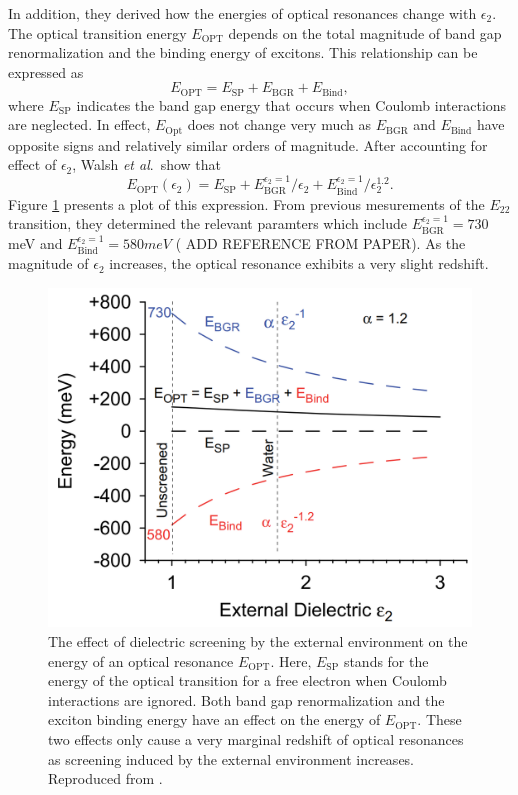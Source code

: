 In addition, they derived how the energies of optical resonances change with $\epsilon_2$. The optical transition energy $E_\text{OPT}$ depends on the total magnitude of band gap renormalization and the binding energy of excitons. This relationship can be expressed as%
%
\begin{equation}
	E_\text{OPT} = E_\text{SP} + E_\text{BGR} + E_\text{Bind},
\end{equation}
%
where $E_\text{SP}$ indicates the band gap energy that occurs when Coulomb interactions are neglected. In effect,  $E_\text{Opt}$ does not change very much as $ E_\text{BGR}$ and $E_\text{Bind}$ have opposite signs and relatively similar orders of magnitude. After accounting for effect of $\epsilon_2$, Walsh \textit{et al}.\ show that%
%
\begin{equation}
	E_\text{OPT}(\epsilon_2) = E_\text{SP} + E_\text{BGR}^{\epsilon_2 = 1}/\epsilon_2 + E_\text{Bind}^{\epsilon_2 = 1}/\epsilon_2^{1.2}.
\end{equation}
%
Figure \ref{fig:energy_shift_walsh} presents a plot of this expression. From previous mesurements of the $E_{22}$ transition, they determined the relevant paramters which include $E_\text{BGR}^{\epsilon_2 = 1} = 730$ meV and $E_\text{Bind}^{\epsilon_2 = 1} = 580 meV$ ({\color{red} ADD REFERENCE FROM PAPER}). As the magnitude of $\epsilon_2$ increases, the optical resonance exhibits a very slight redshift.

\begin{figure}[ht]
	\centering
	\includegraphics[scale=0.25]{images/chapter_optical_props/dielectric_binding_walsh_2007}
	\caption{ The effect of dielectric screening by the external environment on the energy of an optical resonance $E_\text{OPT}$. Here, $E_\text{SP}$ stands for the energy of the optical transition for a free electron when Coulomb interactions are ignored. Both band gap renormalization and the exciton binding energy have an effect on the energy of $E_\text{OPT}$. These two effects only cause a very marginal redshift of optical resonances as screening induced by the external environment increases. Reproduced from \cite{walsh2008scaling}.}
	\label{fig:energy_shift_walsh}
\end{figure}

